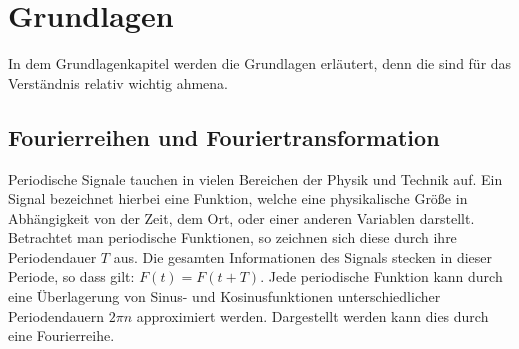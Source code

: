 \chapter{Grundlagen}
In dem Grundlagenkapitel werden die Grundlagen erläutert, denn die sind für das Verständnis relativ wichtig ahmena.

\section{Fourierreihen und Fouriertransformation}
\label{sec:Fourierreihen und Fouriertransformation}
Periodische Signale tauchen in vielen Bereichen der Physik und Technik auf. Ein Signal bezeichnet hierbei eine Funktion, welche eine physikalische Größe in Abhängigkeit von der Zeit, dem Ort, oder einer anderen Variablen darstellt. Betrachtet man periodische Funktionen, so zeichnen sich diese durch ihre Periodendauer $T$ aus. Die gesamten Informationen des Signals stecken in dieser Periode, so dass gilt: $F(t) = F(t+T)$. Jede periodische Funktion kann durch eine Überlagerung von Sinus- und Kosinusfunktionen unterschiedlicher Periodendauern $2 \pi n$ approximiert werden. Dargestellt werden kann dies durch eine Fourierreihe. 

